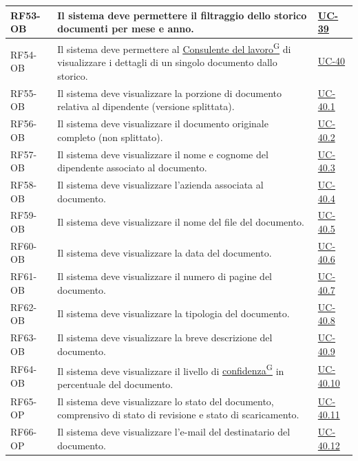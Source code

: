 ﻿\documentclass[a4paper,12pt]{article}
\providecommand{\glslink}[2]{\href{https://alittlebyte-19.github.io/Documentazione/glossario.html\#gls-#1}{\underline{#2}\textsuperscript{\scriptsize G}}}
\begin{document}
{\begin{longtable}{|p{2.5cm}|p{9.5cm}|p{3.5cm}|}
    \hline
    RF53-OB & Il sistema deve permettere il filtraggio dello storico documenti per mese e anno. & \hyperref[fig:uc-39]{UC-39} \\
    \hline
    RF54-OB & Il sistema deve permettere al \glslink{consulente-del-lavoro-cdl}{Consulente del lavoro} di visualizzare i dettagli di un singolo documento dallo storico. & \hyperref[fig:uc-40]{UC-40} \\
    \hline
    RF55-OB & Il sistema deve visualizzare la porzione di documento relativa al dipendente (versione splittata). & \hyperref[fig:uc-40.1]{UC-40.1} \\
    \hline
    RF56-OB & Il sistema deve visualizzare il documento originale completo (non splittato). & \hyperref[fig:uc-40.2]{UC-40.2} \\
    \hline
    RF57-OB & Il sistema deve visualizzare il nome e cognome del dipendente associato al documento. & \hyperref[fig:uc-40.3]{UC-40.3} \\
    \hline
    RF58-OB & Il sistema deve visualizzare l'azienda associata al documento. & \hyperref[fig:uc-40.4]{UC-40.4} \\
    \hline
    RF59-OB & Il sistema deve visualizzare il nome del file del documento. & \hyperref[fig:uc-40.5]{UC-40.5} \\
    \hline
    RF60-OB & Il sistema deve visualizzare la data del documento. & \hyperref[fig:uc-40.6]{UC-40.6} \\
    \hline
    RF61-OB & Il sistema deve visualizzare il numero di pagine del documento. & \hyperref[fig:uc-40.7]{UC-40.7} \\
    \hline
    RF62-OB & Il sistema deve visualizzare la tipologia del documento. & \hyperref[fig:uc-40.8]{UC-40.8} \\
    \hline
    RF63-OB & Il sistema deve visualizzare la breve descrizione del documento. & \hyperref[fig:uc-40.9]{UC-40.9} \\
    \hline
    RF64-OB & Il sistema deve visualizzare il livello di \glslink{confidenza-confidence-score}{confidenza} in percentuale del documento. & \hyperref[fig:uc-40.10]{UC-40.10} \\
   \hline
    RF65-OP & Il sistema deve visualizzare lo stato del documento, comprensivo di stato di revisione e stato di scaricamento. & \hyperref[fig:uc-40.11]{UC-40.11} \\
    \hline
    RF66-OP & Il sistema deve visualizzare l'e-mail del destinatario del documento. & \hyperref[fig:uc-40.12]{UC-40.12} \\
    \hline

\end{longtable}}
\end{document}

